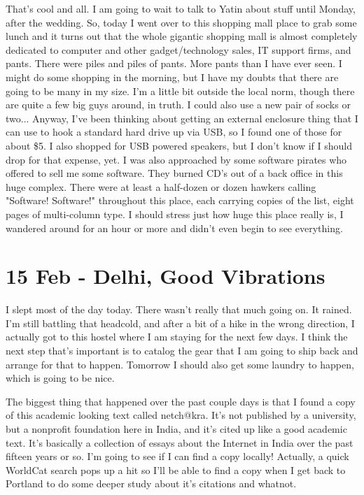 \documentclass[11pt]{amsart}
\begin{document}
That's cool and all. I am going to wait to talk to Yatin about stuff until Monday, after the wedding. So, today I went over to this shopping mall place to grab some lunch and it turns out that the whole gigantic shopping mall is almost completely dedicated to computer and other gadget/technology sales, IT support firms, and pants. There were piles and piles of pants. More pants than I have ever seen. I might do some shopping in the morning, but I have my doubts that there are going to be many in my size. I'm a little bit outside the local norm, though there are quite a few big guys around, in truth. I could also use a new pair of socks or two... Anyway, I've been thinking about getting an external enclosure thing that I can use to hook a standard hard drive up via USB, so I found one of those for about \$5. I also shopped for USB powered speakers, but I don't know if I should drop for that expense, yet. I was also approached by some software pirates who offered to sell me some software. They burned CD's out of a back office in this huge complex. There were at least a half-dozen or dozen hawkers calling "Software! Software!" throughout this place, each carrying copies of the list, eight pages of multi-column type. I should stress just how huge this place really is, I wandered around for an hour or more and didn't even begin to see everything.

\section{15 Feb - Delhi, Good Vibrations}

I slept most of the day today. There wasn't really that much going on. It rained. I'm still battling that headcold, and after a bit of a hike in the wrong direction, I actually got to this hostel where I am staying for the next few days. I think the next step that's important is to catalog the gear that I am going to ship back and arrange for that to happen. Tomorrow I should also get some laundry to happen, which is going to be nice.

The biggest thing that happened over the past couple days is that I found a copy of this academic looking text called netch@kra. It's not published by a university, but a nonprofit foundation here in India, and it's cited up like a good academic text. It's basically a collection of essays about the Internet in India over the past fifteen years or so. I'm going to see if I can find a copy locally! Actually, a quick WorldCat search pops up a hit so I'll be able to find a copy when I get back to Portland to do some deeper study about it's citations and whatnot.
\end{document}
